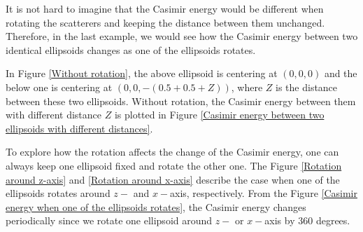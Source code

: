 It is not hard to imagine that the Casimir energy would be different when rotating the scatterers and keeping the distance between them unchanged. Therefore, 
in the last example, we would see how the Casimir energy between two identical ellipsoids changes as one of the ellipsoids rotates.

In Figure \ref{Without rotation}, the above ellipsoid is centering at $(0,0,0)$ and the below one is centering at $(0, 0, -(0.5+0.5+Z))$, where $Z$ is the 
distance between these two ellipsoids. Without rotation, the Casimir energy between them with different distance $Z$ is plotted in Figure 
\ref{Casimir energy between two ellipsoids with different distances}.

To explore how the rotation affects the change of the Casimir energy, one can always keep one ellipsoid fixed and rotate the other one. The Figure 
\ref{Rotation around z-axis} and \ref{Rotation around x-axis} describe the case when one of the ellipsoids rotates around $z-$ and $x-$axis, respectively.
From the Figure \ref{Casimir energy when one of the ellipsoids rotates}, the Casimir energy changes periodically since we rotate one ellipsoid around 
$z-$ or $x-$axis by 360 degrees. 



